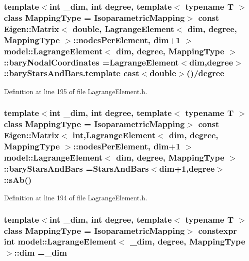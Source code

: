 \subsubsection[{bary\+Nodal\+Coordinates}]{\setlength{\rightskip}{0pt plus 5cm}template$<$int \+\_\+dim, int degree, template$<$ typename T $>$ class Mapping\+Type = Isoparametric\+Mapping$>$ const Eigen\+::\+Matrix$<$ double, {\bf Lagrange\+Element}$<$ {\bf dim}, degree, Mapping\+Type $>$\+::{\bf nodes\+Per\+Element}, {\bf dim}+1 $>$ {\bf model\+::\+Lagrange\+Element}$<$ {\bf dim}, degree, Mapping\+Type $>$\+::bary\+Nodal\+Coordinates ={\bf Lagrange\+Element}$<${\bf dim},degree$>$\+::bary\+Stars\+And\+Bars.\+template cast$<$double$>$()/degree\hspace{0.3cm}{\ttfamily [static]}}\label{classmodel_1_1_lagrange_element_a1477bef208a4816faa1416ebcce1f975}


Definition at line 195 of file Lagrange\+Element.\+h.

\hypertarget{classmodel_1_1_lagrange_element_a99b14264b248306297ffb7b1ac87cf24}{}
\subsubsection[{bary\+Stars\+And\+Bars}]{\setlength{\rightskip}{0pt plus 5cm}template$<$int \+\_\+dim, int degree, template$<$ typename T $>$ class Mapping\+Type = Isoparametric\+Mapping$>$ const Eigen\+::\+Matrix$<$ int,{\bf Lagrange\+Element}$<$ {\bf dim}, degree, Mapping\+Type $>$\+::{\bf nodes\+Per\+Element}, {\bf dim}+1 $>$ {\bf model\+::\+Lagrange\+Element}$<$ {\bf dim}, degree, Mapping\+Type $>$\+::bary\+Stars\+And\+Bars ={\bf Stars\+And\+Bars}$<${\bf dim}+1,degree$>$\+::s\+Ab()\hspace{0.3cm}{\ttfamily [static]}}\label{classmodel_1_1_lagrange_element_a99b14264b248306297ffb7b1ac87cf24}


Definition at line 194 of file Lagrange\+Element.\+h.

\hypertarget{classmodel_1_1_lagrange_element_a56d161032b73c07c77326cfba73d731d}{}
\subsubsection[{dim}]{\setlength{\rightskip}{0pt plus 5cm}template$<$int \+\_\+dim, int degree, template$<$ typename T $>$ class Mapping\+Type = Isoparametric\+Mapping$>$ constexpr int {\bf model\+::\+Lagrange\+Element}$<$ \+\_\+dim, degree, Mapping\+Type $>$\+::dim =\+\_\+dim\hspace{0.3cm}{\ttfamily [static]}}\label{classmodel_1_1_lagrange_element_a56d161032b73c07c77326cfba73d731d}


